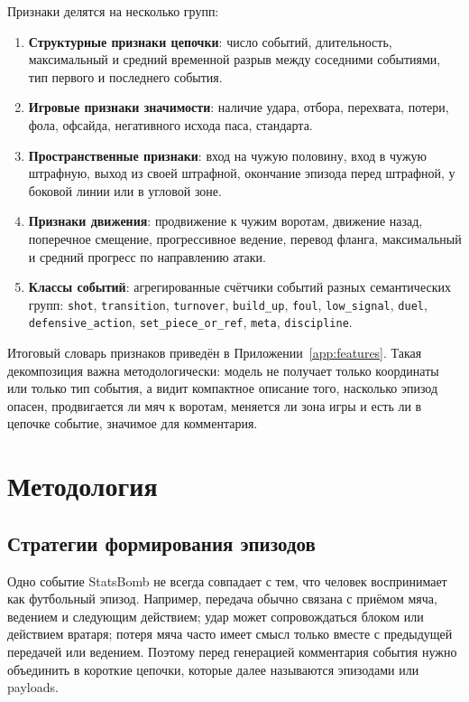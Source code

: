 \documentclass[a4paper,14pt]{extarticle}
\numberwithin{table}{section}
\numberwithin{figure}{section}
\numberwithin{equation}{section}
\begin{document}
Признаки делятся на несколько групп:

\begin{enumerate}
    \item \textbf{Структурные признаки цепочки}: число событий, длительность, максимальный и средний временной разрыв между соседними событиями, тип первого и последнего события.
    \item \textbf{Игровые признаки значимости}: наличие удара, отбора, перехвата, потери, фола, офсайда, негативного исхода паса, стандарта.
    \item \textbf{Пространственные признаки}: вход на чужую половину, вход в чужую штрафную, выход из своей штрафной, окончание эпизода перед штрафной, у боковой линии или в угловой зоне.
    \item \textbf{Признаки движения}: продвижение к чужим воротам, движение назад, поперечное смещение, прогрессивное ведение, перевод фланга, максимальный и средний прогресс по направлению атаки.
    \item \textbf{Классы событий}: агрегированные счётчики событий разных семантических групп: \texttt{shot}, \texttt{transition}, \texttt{turnover}, \texttt{build\_up}, \texttt{foul}, \texttt{low\_signal}, \texttt{duel}, \texttt{defensive\_action}, \texttt{set\_piece\_or\_ref}, \texttt{meta}, \texttt{discipline}.
\end{enumerate}

Итоговый словарь признаков приведён в Приложении~\ref{app:features}. Такая декомпозиция важна методологически: модель не получает только координаты или только тип события, а видит компактное описание того, насколько эпизод опасен, продвигается ли мяч к воротам, меняется ли зона игры и есть ли в цепочке событие, значимое для комментария.

\section{Методология}\label{sec:methodology}

\subsection{Стратегии формирования эпизодов}

Одно событие StatsBomb не всегда совпадает с тем, что человек воспринимает как футбольный эпизод. Например, передача обычно связана с приёмом мяча, ведением и следующим действием; удар может сопровождаться блоком или действием вратаря; потеря мяча часто имеет смысл только вместе с предыдущей передачей или ведением. Поэтому перед генерацией комментария события нужно объединить в короткие цепочки, которые далее называются эпизодами или payloads.
\end{document}
